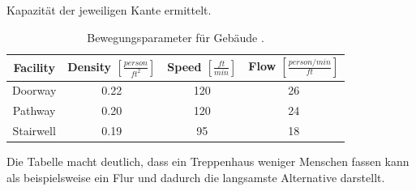 \documentclass[a4paper, 11pt]{scrreprt}
\begin{document}
Kapazität der jeweiligen Kante ermittelt.
\begin{table}[htb!]
\centering
\caption{Bewegungsparameter für Gebäude \cite{movement_params}.}
\label{tab:movement_params}
\begin{tabular}[c]{|c|c|c|c|}\hline
 Facility  & Density $[\frac{person}{ft^2}]$  & Speed $[\frac{ft}{min}]$ & Flow $[\frac{person / min}{ft}]$   \\\hline\hline
  Doorway  & 0.22 & 120 & 26  \\\hline
  Pathway  & 0.20 & 120 & 24  \\\hline
  Stairwell& 0.19 &  95 & 18  \\\hline
\end{tabular}
\end{table}
Die Tabelle macht deutlich, dass ein Treppenhaus weniger Menschen fassen kann als beispielsweise ein
Flur und dadurch die langsamste Alternative darstellt.
\end{document}
